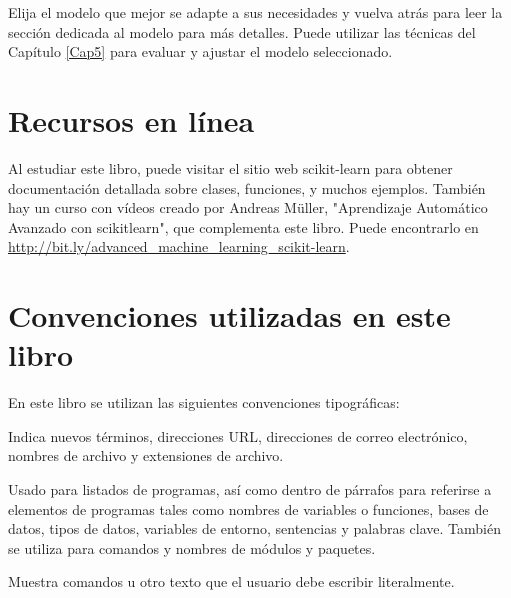 Elija el modelo que mejor se adapte a sus necesidades y vuelva atrás para leer la sección dedicada al modelo para  más detalles.   Puede utilizar las técnicas del Capítulo \ref{Cap5} para evaluar
y ajustar el modelo seleccionado.


\section*{Recursos en línea}

Al estudiar este libro, puede visitar el sitio web {\ttfamily scikit-learn}   para obtener documentación detallada sobre  clases, funciones, y muchos ejemplos. También hay un curso con  vídeos creado por Andreas Müller,  "{}Aprendizaje Automático Avanzado con scikitlearn"{}, que complementa este libro. Puede encontrarlo en  \href{https://www.oreilly.com/library/view/advanced-machine-learning/9781771374927/}{\color{vino}   http://bit.ly/advanced\_machine\_learning\_scikit-learn}.


\section*{Convenciones utilizadas en este libro}


En este libro se utilizan las siguientes convenciones tipográficas:\\


\noindent Indica nuevos términos, direcciones URL, direcciones de correo electrónico, nombres de archivo y extensiones de archivo. \\


\noindent Usado para listados de programas, así como dentro de párrafos para referirse a elementos de programas tales como nombres de variables o funciones, bases de datos, tipos de datos, variables de entorno, sentencias y palabras clave. También se utiliza para comandos y nombres de módulos y paquetes. \\



\noindent Muestra comandos u otro texto que el usuario debe escribir literalmente.\\ 



